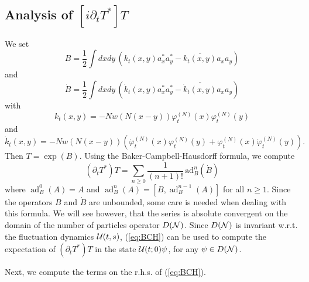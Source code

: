 \documentclass[11pt,a4paper]{article}
\newcommand{\cU}{{\cal U}}
\newcommand{\cN}{{\cal N}}
\newcommand{\ad}{\operatorname{ad}}	%
\begin{document}
\subsection{Analysis of $[i \partial_t T^*] T$}

We set 
\[ B = \frac{1}{2} \int dx dy \, \left( k_t (x,y) a_x^* a_y^* - \overline{k_t (x,y)} a_x a_y \right) \]
and 
\[ \dot{B} =  \frac{1}{2} \int dx dy \, \left( \dot{k}_t (x,y) a_x^* a_y^* - \overline{\dot{k}_t (x,y)} a_x a_y \right) \]
with 
\[ k_t (x,y) = -N w(N(x-y)) \varphi_t^{(N)} (x) \varphi_t^{(N)} (y) \]
and
\[ \dot{k}_t (x,y) = - N w (N (x-y))  \left( \dot{\varphi}_t^{(N)} (x) \varphi_t^{(N)} (y) + \varphi_t^{(N)} (x) \dot{\varphi}_t^{(N)} (y) \right). \]
Then $T = \exp (B)$. Using the Baker-Campbell-Hausdorff formula, we compute
\begin{equation}\label{eq:BCH} \left(\partial_t T^* \right) T = \sum_{n \geq 0} \frac{1}{(n+1)!}\,  \text{ad}^n_{B} (\dot{B}) \end{equation}
where $\ad^0_B (A) = A$ and $\ad^n_B (A) = [B,\ad^{n-1}_B (A)]$ for all $n \geq 1$. Since the operators $B$ and $\dot{B}$ are unbounded, some care is needed when dealing with this formula. We will see however, that the series is absolute convergent on the domain of the number of particles operator $D(\cN)$. Since $D(\cN)$ is invariant w.r.t. the fluctuation dynamics $\cU (t,s)$, (\ref{eq:BCH}) can be used to compute the expectation of $(\partial_t T^*) T$ in the state $\cU (t;0) \psi$, for any $\psi \in D(\cN)$. 

Next, we compute the terms on the r.h.s. of (\ref{eq:BCH}).
\end{document}

